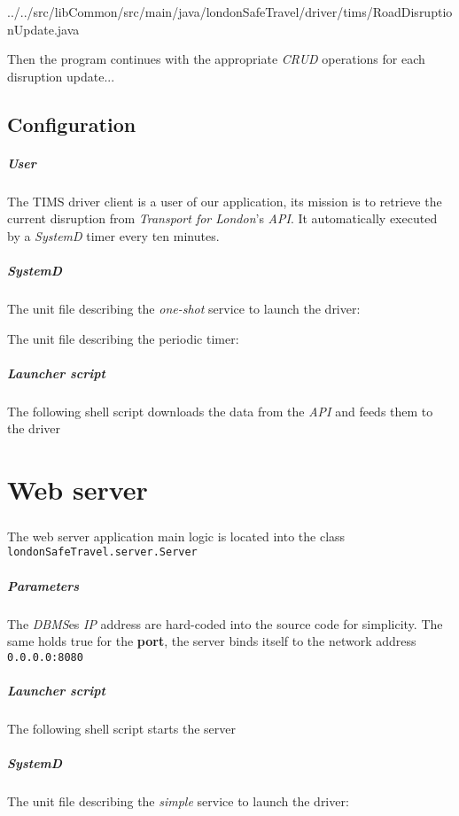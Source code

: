 
{../../src/libCommon/src/main/java/londonSafeTravel/driver/tims/RoadDisruptionUpdate.java}

Then the program continues with the appropriate \textit{CRUD} operations for 
each disruption update...

\section{Configuration}
\paragraph{User}
The TIMS driver client is a user of our application, its mission is to retrieve 
the current disruption from \textit{Transport for London}'s \textit{API}. It 
automatically executed by a \textit{SystemD} timer every ten minutes.

\paragraph{SystemD}
The unit file describing the \textit{one-shot} service to launch the driver:



The unit file describing the periodic timer:



\paragraph{Launcher script}
The following shell script downloads the data from the \textit{API} and feeds 
them to the driver 



\chapter{Web server}
\paragraph{}
The web server application main logic is located into the class \texttt{londonSafeTravel.server.Server}

\paragraph{Parameters}
The \textit{DBMS}es \textit{IP} address are hard-coded into the source code for simplicity. The same holds true for the \textbf{port}, the server binds itself to the network address \texttt{0.0.0.0:8080}

\paragraph{Launcher script}
The following shell script starts the server



\paragraph{SystemD}
The unit file describing the \textit{simple} service to launch the driver:


